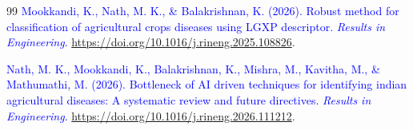 \documentclass[]{interact}
\theoremstyle{plain}
\theoremstyle{definition}
\theoremstyle{remark}
\begin{document}
\begin{thebibliography}{99}
\textcolor{blue}{Mookkandi, K., Nath, M. K., \& Balakrishnan, K. (2026). Robust method for classification of agricultural crops diseases using LGXP descriptor. \emph{Results in Engineering}. \url{https://doi.org/10.1016/j.rineng.2025.108826}.}

\textcolor{blue}{Nath, M. K., Mookkandi, K., Balakrishnan, K., Mishra, M., Kavitha, M., \& Mathumathi, M. (2026). Bottleneck of AI driven techniques for identifying indian agricultural diseases: A systematic review and future directives. \emph{Results in Engineering}. \url{https://doi.org/10.1016/j.rineng.2026.111212}.}

\end{thebibliography}
\end{document}
